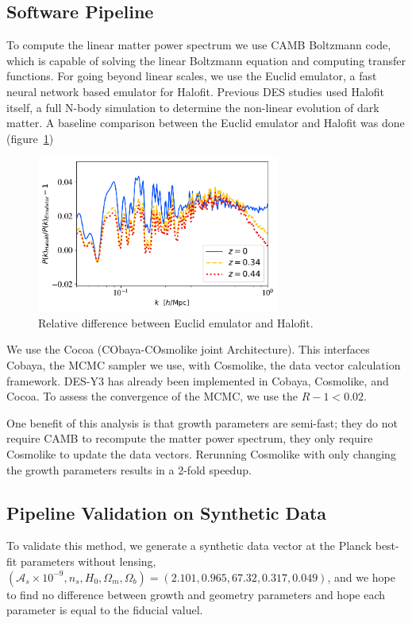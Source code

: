 \subsection{Software Pipeline}
To compute the linear matter power spectrum we use \textsc{CAMB} Boltzmann code, which is capable of solving the linear Boltzmann equation and computing transfer functions. For going beyond linear scales, we use the Euclid emulator, a fast neural network based emulator for Halofit. Previous DES studies used Halofit itself, a full N-body simulation to determine the non-linear evolution of dark matter. A baseline comparison between the Euclid emulator and Halofit was done (figure~\ref{fig:euc_v_halo})
\begin{figure}[ht]
	\centering
	\includegraphics[width=8cm]{plots/halo_vs_emu.pdf}
	\caption{Relative difference between Euclid emulator and Halofit.}
	\label{fig:euc_v_halo}
\end{figure}
We use the Cocoa (CObaya-COsmolike joint Architecture). This interfaces Cobaya, the MCMC sampler we use, with Cosmolike, the data vector calculation framework. DES-Y3 has already been implemented in Cobaya, Cosmolike, and Cocoa. To assess the convergence of the MCMC, we use the $R-1<0.02$.

One benefit of this analysis is that growth parameters are semi-fast; they do not require CAMB to recompute the matter power spectrum, they only require Cosmolike to update the data vectors. Rerunning Cosmolike with only changing the growth parameters results in a 2-fold speedup.
\subsection{Pipeline Validation on Synthetic Data}
To validate this method, we generate a synthetic data vector at the Planck best-fit parameters without lensing, $(\mathcal{A}_s\times10^{-9}, n_s, H_0, \Omega_m, \Omega_b) = (2.101,0.965,67.32,0.317,0.049)$, and we hope to find no difference between growth and geometry parameters and hope each parameter is equal to the fiducial valuel.

